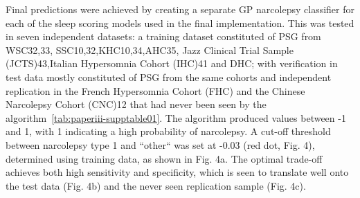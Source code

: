 Final predictions were achieved by creating a separate \ac{GP} narcolepsy classifier for each of the sleep scoring models used in the final implementation. 
This was tested in seven independent datasets: a training dataset constituted of PSG from WSC32,33, SSC10,32,KHC10,34,AHC35, Jazz Clinical Trial Sample (JCTS)43,Italian Hypersomnia Cohort (IHC)41 and DHC; with verification in test data mostly constituted of PSG from the same cohorts and independent replication in the French Hypersomnia Cohort (FHC) and the Chinese Narcolepsy Cohort (CNC)12 that had never been seen by the algorithm~\cref{tab:paperiii-supptable01}. 
The algorithm produced values between -1 and 1, with 1 indicating a high probability of narcolepsy. 
A cut-off threshold between narcolepsy type 1 and “other“ was set at -0.03 (red dot, Fig. 4), determined using training data, as shown in Fig. 4a. 
The optimal trade-off achieves both high sensitivity and specificity, which is seen to translate well onto the test data (Fig. 4b) and the never seen replication sample (Fig. 4c).

